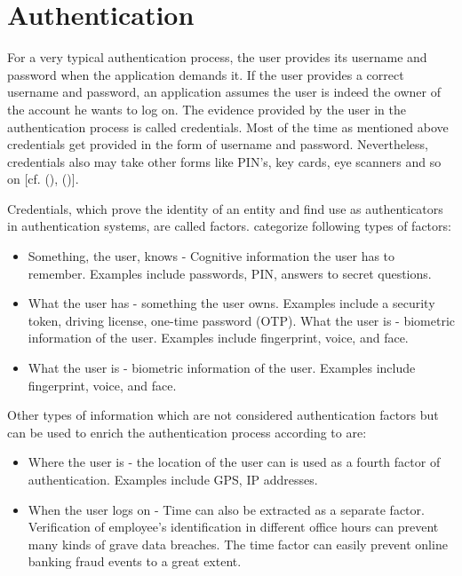 \section{Authentication}
For a very typical authentication process, the user provides its username and password when the application demands it. If the user provides a correct username and password, an application assumes the user is indeed the owner of the account he wants to log on. The evidence provided by the user in the authentication process is called credentials. Most of the time as mentioned above credentials get provided in the form of username and password. Nevertheless, credentials also may take other forms like PIN’s, key cards, eye scanners and so on [cf. (\citet{Todorov:2007:MUI}), (\citet{Boyed:2012:GSOA})]. 

Credentials, which prove the identity of an entity and find use as authenticators in authentication systems, are called factors. \citet{NIST:2017:DIG} categorize following types of factors:

\begin{itemize}  
	\item Something, the user, knows - Cognitive information the user has to remember. Examples include passwords, PIN, answers to secret questions.
	\item What the user has - something the user owns. Examples include a security token, driving license, one-time password (OTP). 
	What the user is - biometric information of the user. Examples include fingerprint, voice, and face.  
	\item What the user is - biometric information of the user. Examples include fingerprint, voice, and face. 
\end{itemize}

Other types of information which are not considered authentication factors but  can be used to enrich the authentication process according to \citet{Dasgupta:2017:AUA} are:

\begin{itemize}
	\item Where the user is - the location of the user can is used as a fourth factor of authentication. Examples include GPS, IP addresses.
	\item When the user logs on - Time can also be extracted as a separate factor. Verification of employee’s identification in different office hours can prevent many kinds of grave data breaches. The time factor can easily prevent online banking fraud events to a great extent. 
\end{itemize}

